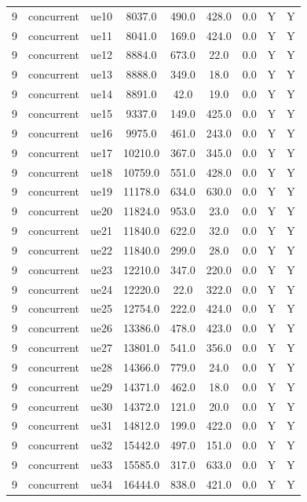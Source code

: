 \begin{table}[ht]
\begin{tabular}{|c|c|c|c|c|c|c|c|c|}
9 & concurrent & ue10 & 8037.0 & 490.0 & 428.0 & 0.0 & Y & Y \\
9 & concurrent & ue11 & 8041.0 & 169.0 & 424.0 & 0.0 & Y & Y \\
9 & concurrent & ue12 & 8884.0 & 673.0 & 22.0 & 0.0 & Y & Y \\
9 & concurrent & ue13 & 8888.0 & 349.0 & 18.0 & 0.0 & Y & Y \\
9 & concurrent & ue14 & 8891.0 & 42.0 & 19.0 & 0.0 & Y & Y \\
9 & concurrent & ue15 & 9337.0 & 149.0 & 425.0 & 0.0 & Y & Y \\
9 & concurrent & ue16 & 9975.0 & 461.0 & 243.0 & 0.0 & Y & Y \\
9 & concurrent & ue17 & 10210.0 & 367.0 & 345.0 & 0.0 & Y & Y \\
9 & concurrent & ue18 & 10759.0 & 551.0 & 428.0 & 0.0 & Y & Y \\
9 & concurrent & ue19 & 11178.0 & 634.0 & 630.0 & 0.0 & Y & Y \\
9 & concurrent & ue20 & 11824.0 & 953.0 & 23.0 & 0.0 & Y & Y \\
9 & concurrent & ue21 & 11840.0 & 622.0 & 32.0 & 0.0 & Y & Y \\
9 & concurrent & ue22 & 11840.0 & 299.0 & 28.0 & 0.0 & Y & Y \\
9 & concurrent & ue23 & 12210.0 & 347.0 & 220.0 & 0.0 & Y & Y \\
9 & concurrent & ue24 & 12220.0 & 22.0 & 322.0 & 0.0 & Y & Y \\
9 & concurrent & ue25 & 12754.0 & 222.0 & 424.0 & 0.0 & Y & Y \\
9 & concurrent & ue26 & 13386.0 & 478.0 & 423.0 & 0.0 & Y & Y \\
9 & concurrent & ue27 & 13801.0 & 541.0 & 356.0 & 0.0 & Y & Y \\
9 & concurrent & ue28 & 14366.0 & 779.0 & 24.0 & 0.0 & Y & Y \\
9 & concurrent & ue29 & 14371.0 & 462.0 & 18.0 & 0.0 & Y & Y \\
9 & concurrent & ue30 & 14372.0 & 121.0 & 20.0 & 0.0 & Y & Y \\
9 & concurrent & ue31 & 14812.0 & 199.0 & 422.0 & 0.0 & Y & Y \\
9 & concurrent & ue32 & 15442.0 & 497.0 & 151.0 & 0.0 & Y & Y \\
9 & concurrent & ue33 & 15585.0 & 317.0 & 633.0 & 0.0 & Y & Y \\
9 & concurrent & ue34 & 16444.0 & 838.0 & 421.0 & 0.0 & Y & Y \\

\end{tabular}
\end{table}
